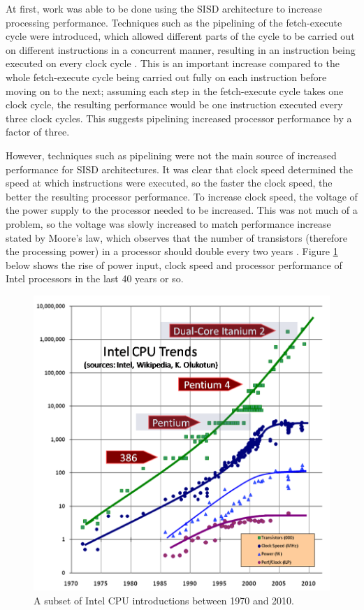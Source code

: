 \documentclass[a4paper, 12pt]{article}
\begin{document}
At first, work was able to be done using the SISD architecture to increase processing performance. Techniques such as the pipelining of the fetch-execute cycle were introduced, which allowed different parts of the cycle to be carried out on different instructions in a concurrent manner, resulting in an instruction being executed on every clock cycle \cite{Iba08}. This is an important increase compared to the whole fetch-execute cycle being carried out fully on each instruction before moving on to the next; assuming each step in the fetch-execute cycle takes one clock cycle, the resulting performance would be one instruction executed every three clock cycles. This suggests pipelining increased processor performance by a factor of three.

However, techniques such as pipelining were not the main source of increased performance for SISD architectures. It was clear that clock speed determined the speed at which instructions were executed, so the faster the clock speed, the better the resulting processor performance. To increase clock speed, the voltage of the power supply to the processor needed to be increased. This was not much of a problem, so the voltage was slowly increased to match performance increase stated by Moore's law, which observes that the number of transistors (therefore the processing power) in a processor should double every two years \cite{Moo65}. Figure \ref{cpu_trends} below shows the rise of power input, clock speed and processor performance of Intel processors in the last 40 years or so.

\begin{figure}[H]
\centering
\includegraphics[width=\textwidth]{trend_graph.png}
\caption[A subset of Intel CPU introductions between 1970 and 2010]{A subset of Intel CPU introductions between 1970 and 2010. \cite{Sut05}}
\label{cpu_trends}
\end{figure}
\end{document}
